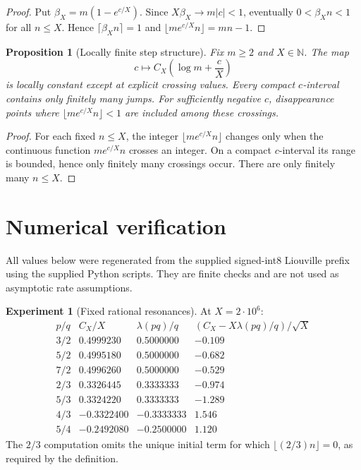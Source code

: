 \documentclass[preprint,12pt]{elsarticle}
\numberwithin{equation}{section}
\theoremstyle{plain}
\newtheorem{proposition}[theorem]{Proposition}
\theoremstyle{definition}
\newtheorem{experiment}[theorem]{Experiment}
\theoremstyle{remark}
\begin{document}
\begin{proof}
Put $\beta_X=m(1-e^{c/X})$. Since $X\beta_X\to m|c|<1$, eventually
$0<\beta_Xn<1$ for all $n\le X$. Hence
$\lceil\beta_Xn\rceil=1$ and $\lfloor me^{c/X}n\rfloor=mn-1$.
\end{proof}

\begin{proposition}[Locally finite step structure]
Fix $m\ge2$ and $X\in\mathbb N$. The map
\[
c\longmapsto C_X\!\left(\log m+\frac cX\right)
\]
is locally constant except at explicit crossing values. Every compact
$c$-interval contains only finitely many jumps. For sufficiently negative
$c$, disappearance points where $\lfloor me^{c/X}n\rfloor<1$ are included
among these crossings.
\end{proposition}

\begin{proof}
For each fixed $n\le X$, the integer $\lfloor me^{c/X}n\rfloor$ changes only
when the continuous function $me^{c/X}n$ crosses an integer. On a compact
$c$-interval its range is bounded, hence only finitely many crossings occur.
There are only finitely many $n\le X$.
\end{proof}

\section{Numerical verification}
\label{sec:numerics}

All values below were regenerated from the supplied signed-int8 Liouville
prefix using the supplied Python scripts. They are finite checks and are not
used as asymptotic rate assumptions.

\begin{experiment}[Fixed rational resonances]
At $X=2\cdot10^6$:
\[
\begin{array}{c|r|r|r}
p/q & C_X/X & \lambda(pq)/q & (C_X-X\lambda(pq)/q)/\sqrt X\\ \hline
3/2 &  0.4999230 &  0.5000000 & -0.109\\
5/2 &  0.4995180 &  0.5000000 & -0.682\\
7/2 &  0.4996260 &  0.5000000 & -0.529\\
2/3 &  0.3326445 &  0.3333333 & -0.974\\
5/3 &  0.3324220 &  0.3333333 & -1.289\\
4/3 & -0.3322400 & -0.3333333 &  1.546\\
5/4 & -0.2492080 & -0.2500000 &  1.120
\end{array}
\]
The $2/3$ computation omits the unique initial term for which
$\lfloor(2/3)n\rfloor=0$, as required by the definition.
\end{experiment}
\end{document}
